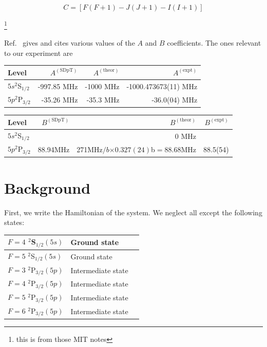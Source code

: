 \begin{equation}
C=[F(F+1)-J(J+1)-I(I+1)]
\end{equation}

\footnote{this is from those MIT notes}

Ref.\ \cite{safronova2photon} gives and cites various values of the $A$ and $B$ coefficients. The ones relevant to our experiment are 


\begin{center}
\begin{tabular}{|l|r|r|r|}
\hline
Level &  $A^{\mathrm{(SDpT)}}$ &$A^{\mathrm{(theor)}}$ & $A^{\mathrm{(expt)}}$ \\ \hline \hline
$5s ^2$S$_{1/2}$&-997.85 MHz& -1000 MHz& -1000.473673(11) MHz\\ \hline
$5p ^2$P$_{3/2}$&-35.26 MHz&-35.3 MHz&-36.0(04) MHz\\ \hline
\end{tabular}
\end{center}

\begin{center}
\begin{tabular}{|l|r|r|r|}
\hline
Level &  $B^{\mathrm{(SDpT)}}$ &$B^{\mathrm{(theor)}}$ & $B^{\mathrm{(expt)}}$ \\ \hline \hline
$5s ^2$S$_{1/2}$&&0  MHz&  \\ \hline
$5p ^2$P$_{3/2}$&88.94MHz&271MHz$/b$$\times 0.327(24)$b$=88.68$MHz&88.5(54) \\ \hline
\end{tabular}
\end{center}


\section{Background}

First, we write the Hamiltonian of the system. We neglect all except the following states: %
\begin{center}
\begin{tabular}{|l|l|||r|}
\hline
$F=4$ $^2$S$_{1/2} (5s)$ & Ground state  \\ \hline
$F=5$ $^2$S$_{1/2} (5s)$ & Ground state  \\ \hline
$F=3$ $^2$P$_{3/2} (5p)$ & Intermediate state  \\ \hline
$F=4$ $^2$P$_{3/2} (5p)$ & Intermediate state  \\ \hline
$F=5$ $^2$P$_{3/2} (5p)$ & Intermediate state  \\ \hline
$F=6$ $^2$P$_{3/2} (5p)$ & Intermediate state  \\ \hline
\end{tabular}
\end{center}

